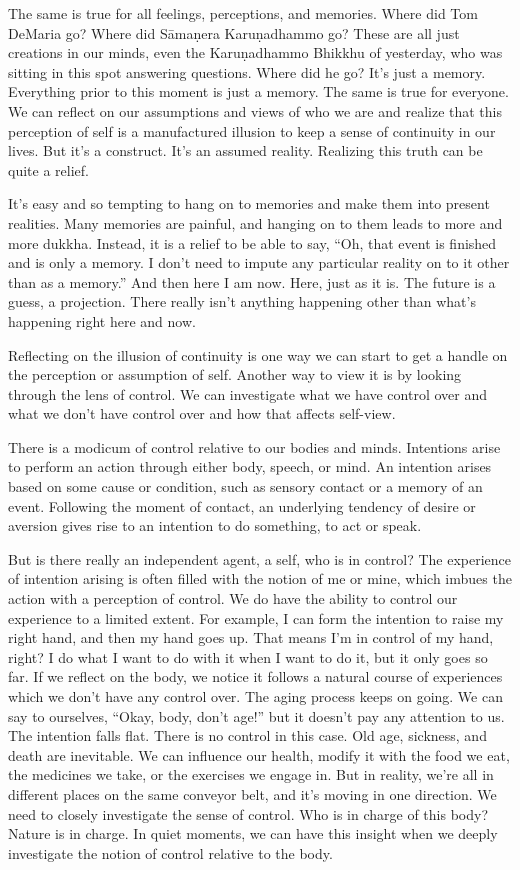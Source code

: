 The same is true for all feelings, perceptions, and memories. Where did Tom DeMaria go? Where did Sāmaṇera Karuṇadhammo go? These are all just creations in our minds, even the Karuṇadhammo Bhikkhu of yesterday, who was sitting in this spot answering questions. Where did he go? It's just a memory. Everything prior to this moment is just a memory. The same is true for everyone. We can reflect on our assumptions and views of who we are and realize that this perception of self is a manufactured illusion to keep a sense of continuity in our lives. But it's a construct. It's an assumed reality. Realizing this truth can be quite a relief.

It's easy and so tempting to hang on to memories and make them into present realities. Many memories are painful, and hanging on to them leads to more and more dukkha. Instead, it is a relief to be able to say, ``Oh, that event is finished and is only a memory. I don't need to impute any particular reality on to it other than as a memory.'' And then here I am now. Here, just as it is. The future is a guess, a projection. There really isn't anything happening other than what's happening right here and now.

Reflecting on the illusion of continuity is one way we can start to get a handle on the perception or assumption of self. Another way to view it is by looking through the lens of control. We can investigate what we have control over and what we don't have control over and how that affects self-view.

There is a modicum of control relative to our bodies and minds. Intentions arise to perform an action through either body, speech, or mind. An intention arises based on some cause or condition, such as sensory contact or a memory of an event. Following the moment of contact, an underlying tendency of desire or aversion gives rise to an intention to do something, to act or speak.

But is there really an independent agent, a self, who is in control? The experience of intention arising is often filled with the notion of me or mine, which imbues the action with a perception of control. We do have the ability to control our experience to a limited extent. For example, I can form the intention to raise my right hand, and then my hand goes up. That means I'm in control of my hand, right? I do what I want to do with it when I want to do it, but it only goes so far. If we reflect on the body, we notice it follows a natural course of experiences which we don't have any control over. The aging process keeps on going. We can say to ourselves, ``Okay, body, don't age!'' but it doesn't pay any attention to us. The intention falls flat. There is no control in this case. Old age, sickness, and death are inevitable. We can influence our health, modify it with the food we eat, the medicines we take, or the exercises we engage in. But in reality, we're all in different places on the same conveyor belt, and it's moving in one direction. We need to closely investigate the sense of control. Who is in charge of this body? Nature is in charge. In quiet moments, we can have this insight when we deeply investigate the notion of control relative to the body.

